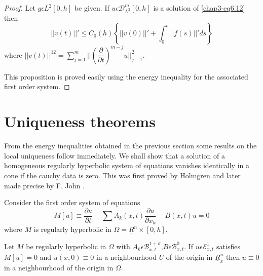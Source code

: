 \begin{proof}
Let $g \epsilon L^2 [0, h]$ be given. If $u \epsilon
\mathscr{D}^m_{L^2}[0, h]$ is a solution of \eqref{chap3-eq6.12} then 
\begin{equation}
|| v(t)||' \leq C_0 (h) \left\{ || v(0)||'+ \int^t_0 || f(s)||'
 ds\right\} \tag{6.19} \label{chap3-eq6.19}
\end{equation}
where $|| v(t)||^{12} = \sum\limits^m_{j=1}||(\dfrac{\partial}{\partial 
  t})^{m-j} u ||^2_{j-1}$. 

This proposition is proved easily using the energy inequality for the
associated first order system. 
\end{proof}

\section{Uniqueness theorems}\pageoriginale\label{chap3-sec7}%

From the energy inequalities obtained in the previous section some
results on the local uniqueness follow immediately. We shall show that
a solution of a homogeneous regularly hyperbolic system of equations
vanishes identically in a cone if the cauchy data is zero. This was
first proved by Holmgren and later made precise by F. John \cite{key1}. 

Consider the first order system of equations 
\begin{equation}
M[u] \equiv \frac{\partial u}{ \partial t}- \sum A_k (x, t)\frac{
  \partial u}{\partial x_k} - B(x, t) u = 0 \tag{7.1}\label{chap3-eq7.1} 
\end{equation}
where $M$ is regularly hyperbolic in $\Omega = \underline{R}^n
\times[0, h]$. 

\setcounter{proposition}{0}
\begin{proposition}\label{chap3-sec7-prop1}%
Let $M$ be regularly hyperbolic in $\Omega$ with $A_k \epsilon
\mathscr{B}^{1 + \sigma}_{x, t}$,\break $B \epsilon \mathscr{B}^0_{x,
  t}$. If $u \epsilon \mathscr{E}^1_{x, t}$ satisfies $M[u] = 0$ and
$u(x, 0) \equiv 0$ in a neighbourhood $U$ of the origin in
$\underline{R}^n_x$ then $u \equiv 0$ in a neighbourhood of the origin
in $\Omega$. 
\end{proposition}

